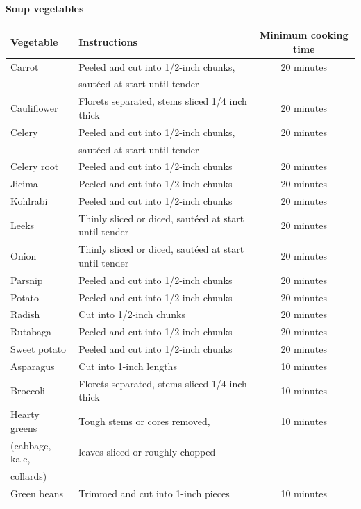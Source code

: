 \documentclass{article}
\numberwithin{figure}{section}
\numberwithin{equation}{section}
\begin{document}
\pagebreak
{\bf Soup vegetables}
\begin{table}[h!]
  \begin{center}
    \begin{tabular}{l|l|c} %
      \textbf{Vegetable} & \textbf{Instructions} & \textbf{Minimum cooking time}\\
      \hline
      Carrot & Peeled and cut into 1/2-inch chunks, & 20 minutes\\ & sautéed at start until tender &\\
      Cauliflower & Florets separated, stems sliced 1/4 inch thick & 20 minutes\\
      Celery & Peeled and cut into 1/2-inch chunks,  & 20 minutes\\ & sautéed at start until tender &\\
      Celery root & Peeled and cut into 1/2-inch chunks & 20 minutes\\
      Jicima & Peeled and cut into 1/2-inch chunks & 20 minutes\\
      Kohlrabi & Peeled and cut into 1/2-inch chunks & 20 minutes\\
      Leeks & Thinly sliced or diced, sautéed at start until tender & 20 minutes\\
      Onion & Thinly sliced or diced, sautéed at start until tender	 & 20 minutes\\
      Parsnip & Peeled and cut into 1/2-inch chunks	& 20 minutes\\
      Potato & Peeled and cut into 1/2-inch chunks& 20 minutes\\
      Radish & Cut into 1/2-inch chunks	& 20 minutes\\
      Rutabaga & Peeled and cut into 1/2-inch chunks	& 20 minutes\\
      Sweet potato & Peeled and cut into 1/2-inch chunks	& 20 minutes\\
      Asparagus & Cut into 1-inch lengths	 & 10 minutes\\
      Broccoli & Florets separated, stems sliced 1/4 inch thick	& 10 minutes\\
      Hearty greens& Tough stems or cores removed, & 10 minutes \\(cabbage, kale, & leaves sliced or roughly chopped & \\collards) & 	 & \\
      Green beans & Trimmed and cut into 1-inch pieces & 10 minutes\\

\end{tabular}
\end{center}
\end{table}
\end{document}
